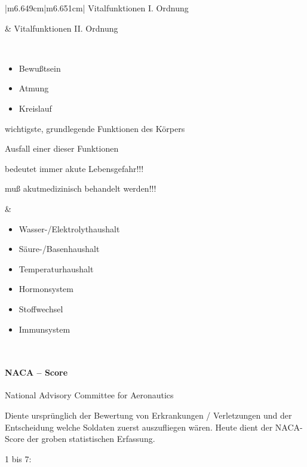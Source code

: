 \documentclass{article}
\begin{document}
\begin{center}
\tablehead{}\begin{supertabular}{|m{6.649cm}|m{6.651cm}|}
\hline
Vitalfunktionen I. Ordnung

 &
Vitalfunktionen II. Ordnung

\\\hline
\begin{itemize}
\item Bewu{\ss}tsein

\item Atmung

\item Kreislauf

\end{itemize}
wichtigste, grundlegende Funktionen des K\"orpers

Ausfall einer dieser Funktionen 

bedeutet immer akute Lebensgefahr!!! 

mu{\ss} akutmedizinisch behandelt werden!!!

 &
\begin{itemize}
\item Wasser-/Elektrolythaushalt

\item S\"aure-/Basenhaushalt

\item Temperaturhaushalt

\item Hormonsystem

\item Stoffwechsel

\item Immunsystem

\end{itemize}
\\\hline
\end{supertabular}
\end{center}
\paragraph[NACA -- Score]{NACA -- Score}
National Advisory Committee for Aeronautics

Diente urspr\"unglich der Bewertung von  Erkrankungen / Verletzungen und
der Entscheidung welche Soldaten zuerst auszufliegen w\"aren. Heute
dient der NACA-Score der groben statistischen Erfassung.  

1 bis 7:
\end{document}
